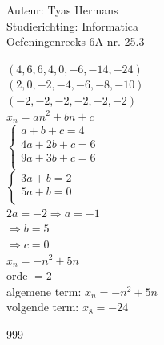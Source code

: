 \documentclass[a4paper]{article}
\begin{document}
  
\noindent \large Auteur: Tyas Hermans \\
\noindent \large Studierichting: Informatica\\
\noindent \large Oefeningenreeks 6A nr. 25.3 \\

\medskip

\normalsize

$(4, 6, 6, 4, 0, -6, -14, -24)$\\

$(2, 0, -2, -4, -6, -8, -10)$\\

$(-2, -2, -2, -2, -2, -2)$\\

$x_n = an^2+bn+c$\\

$\left\{\begin{array}{l}
a+b+c = 4\\
4a+2b+c = 6\\
9a+3b+c = 6\\
\end{array}\right.$\\

$\left\{\begin{array}{l}
3a+b = 2\\
5a+b = 0\\
\end{array}\right.$\\

$2a = -2 \Rightarrow a = -1$\\

$\Rightarrow b = 5$\\

$\Rightarrow c = 0$\\

$x_n = -n^2+5n$\\

orde $=2$\\

algemene term: $x_n = -n^2+5n$\\

volgende term: $x_8 = -24$\\



\begin{thebibliography}{999}
\end{thebibliography}
\end{document}
